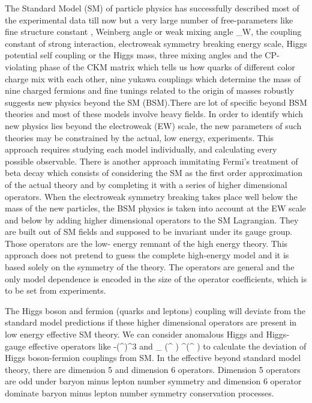 \documentclass[final,3p]{CSP}
\begin{document}
The Standard Model (SM) of particle physics has successfully described most of the experimental data till now but a very large number of
free-parameters like fine structure constant \alpha, Weinberg angle or weak mixing angle \theta_W, the coupling constant of strong 
interaction, electroweak symmetry breaking energy scale, Higgs potential self coupling or the Higgs mass, three mixing angles and the 
CP-violating phase of the CKM matrix which tells us how quarks of different color charge mix with each other, nine yukawa couplings 
which determine the mass of nine charged fermions and fine tunings related to the origin of masses robustly suggests new physics beyond 
the SM (BSM).There are lot of specific beyond BSM theories and most of these models involve heavy fields. In order to identify which new 
physics lies beyond the electroweak (EW) scale, the new parameters of such theories may be constrained by the actual, low energy, 
experiments. This approach requires studying each model individually, and calculating every possible observable. There is another 
approach immitating Fermi’s treatment of beta decay which consists of considering the SM as the first order approximation of the actual 
theory and by completing it with a series of higher dimensional operators. When the electroweak symmetry breaking takes place well below 
the mass of the new particles, the BSM physics is taken into account at the EW scale and below by adding higher dimensional operators to 
the SM Lagrangian. They are built out of SM fields and supposed to be invariant under its gauge group. Those operators are the low-
energy remnant of the high energy theory. This approach does not pretend to guess the complete high-energy model and it is based solely 
on the symmetry of the  theory. The operators are general and the only model dependence is encoded in the size of the operator 
coefficients, which is to be set from experiments. 

The Higgs boson and fermion (quarks and leptons) coupling will deviate from the standard model predictions if these higher dimensional 
operators are present in low energy effective SM theory. We can consider anomalous Higgs and Higgs-gauge effective operators like -(\phi^{\dagger}\phi)^3 and  \partial_{\mu} (\phi^{\dagger} \phi) \partial^{\mu}(\phi^{\dagger} \phi) to calculate the deviation of Higgs boson-fermion couplings from SM. In the effective beyond standard model theory, there are dimension 5 and dimension 6 operators. Dimension 5 operators are odd under baryon minus lepton number symmetry and dimension 6 operator dominate baryon minus lepton number symmetry conservation processes. 
\end{document}
